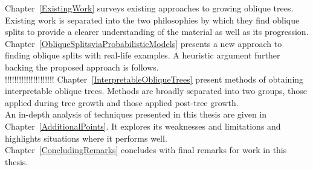 Chapter~\ref{ExistingWork} surveys existing approaches to growing oblique trees. Existing work is separated into the two philosophies by which they find oblique splits to provide a clearer understanding of the material as well as its progression. \\

Chapter~\ref{ObliqueSplitsviaProbabilisticModels} presents a new approach to finding oblique splits with real-life examples. A heuristic argument further backing the proposed approach is follows. \\

!!!!!!!!!!!!!!!!!!!!!
Chapter~\ref{InterpretableObliqueTrees} present methods of obtaining interpretable oblique trees. Methods are broadly separated into two groups, those applied during tree growth and those applied post-tree growth.\\

An in-depth analysis of techniques presented in this thesis are given in Chapter~\ref{AdditionalPoints}. It explores its weaknesses and limitations and highlights situations where it performs well.\\

Chapter~\ref{ConcludingRemarks} concludes with final remarks for work in this thesis.